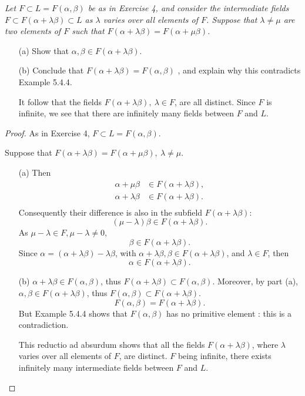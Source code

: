 \documentclass[11pt,a4paper]{article}
\begin{document}
{\it Let $F \subset L = F(\alpha,\beta)$ be as in Exercise 4, and consider the intermediate fields $F \subset F(\alpha + \lambda \beta) \subset L$ as $\lambda$ varies over all elements of $F$. Suppose that $\lambda \ne \mu$ are two elements of $F$ such that $F(\alpha + \lambda \beta) = F(\alpha + \mu \beta)$.
\begin{enumerate}
\item[(a)] Show that $\alpha, \beta \in F(\alpha + \lambda \beta)$.
\item[(b)] Conclude that $F(\alpha + \lambda \beta) = F(\alpha,\beta)$ , and explain why this contradicts Example 5.4.4.

It follow that the fields $F(\alpha + \lambda \beta),\  \lambda \in F$, are all distinct. Since $F$ is infinite, we see that there are infinitely many fields between $F$ and $L$.
\end{enumerate}
}

\begin{proof}
As in Exercise 4,  $F\subset L=F(\alpha,\beta)$.

Suppose that $F(\alpha+\lambda \beta) = F(\alpha+\mu \beta),\  \lambda \neq \mu$.
\begin{enumerate}
\item[(a)]
Then
\begin{align*}
\alpha + \mu \beta &\in F(\alpha+\lambda \beta),\\
\alpha + \lambda \beta &\in F(\alpha+\lambda \beta).\\
\end{align*}
Consequently their difference is also in the subfield $F(\alpha+\lambda \beta)$:
$$(\mu-\lambda) \beta\in F(\alpha+\lambda \beta).$$
As $\mu - \lambda \in F, \mu- \lambda \neq 0$, $$\beta \in F(\alpha+\lambda \beta).$$
Since $\alpha = (\alpha+\lambda \beta) - \lambda \beta$, with $\alpha+\lambda \beta,\beta \in F(\alpha+\lambda \beta)$, and $\lambda \in F$, then
$$\alpha \in F(\alpha+\lambda \beta).$$

\item[(b)]
$\alpha + \lambda \beta \in F(\alpha,\beta)$, thus $F(\alpha + \lambda \beta) \subset F(\alpha,\beta)$.
Moreover, by part (a),  $\alpha,\beta \in F(\alpha+\lambda \beta)$, thus $F(\alpha,\beta) \subset F(\alpha+\lambda \beta)$.
$$F(\alpha,\beta) = F(\alpha+\lambda \beta).$$
But Example 5.4.4 shows that $F(\alpha,\beta)$ has no primitive element : this is a contradiction. 

This reductio ad absurdum shows that all the fields $F(\alpha+\lambda \beta)$, where $\lambda$ varies over all elements of $F$, are distinct. $F$ being infinite, there exists infinitely many intermediate fields between $F$ and $L$.
\end{enumerate}
\end{proof}
\end{document}
